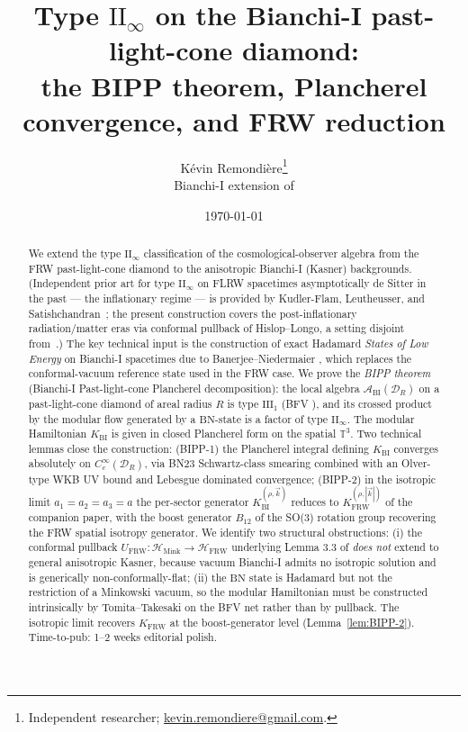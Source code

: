 \documentclass[11pt,a4paper]{article}
\title{Type $\mathrm{II}_\infty$ on the Bianchi-I past-light-cone diamond:\\
the BIPP theorem, Plancherel convergence, and FRW reduction}
\author{K\'evin Remondi\`ere\thanks{Independent researcher; \href{mailto:kevin.remondiere@gmail.com}{kevin.remondiere@gmail.com}.}\\
\small Bianchi-I extension of \cite{ECI-FRW-note}}
\date{\today}
\theoremstyle{definition}
\newcommand{\T}{\mathbb{T}}
\newcommand{\cA}{\mathcal{A}}
\newcommand{\cH}{\mathcal{H}}
\newcommand{\cD}{\mathcal{D}}
\newcommand{\Mink}{\mathrm{Mink}}
\newcommand{\BI}{\mathrm{BI}}
\newcommand{\FRW}{\mathrm{FRW}}
\newcommand{\BN}{\mathrm{BN}}
\begin{document}
\maketitle

\begin{abstract}
We extend the type $\mathrm{II}_\infty$ classification of the cosmological-observer
algebra from the FRW past-light-cone diamond \cite{ECI-FRW-note,Witten2022,KLS24} to
the anisotropic Bianchi-I (Kasner) backgrounds. (Independent prior art for type
$\mathrm{II}_\infty$ on FLRW spacetimes asymptotically de Sitter in the past --- the
inflationary regime --- is provided by Kudler-Flam, Leutheusser, and
Satishchandran~\cite{KLS24}; the present construction covers the
post-inflationary radiation/matter eras via conformal pullback of
Hislop--Longo, a setting disjoint from~\cite{KLS24}.) The key technical input
is the construction of exact Hadamard \emph{States of Low Energy} on Bianchi-I
spacetimes due to Banerjee--Niedermaier \cite{BN23}, which replaces the
conformal-vacuum reference state used in the FRW case. We prove the
\emph{BIPP theorem} (Bianchi-I Past-light-cone Plancherel decomposition):
the local algebra $\cA_\BI(\cD_R)$ on a past-light-cone diamond of areal
radius $R$ is type $\mathrm{III}_1$ (BFV \cite{BFV03}), and its crossed product
by the modular flow generated by a $\BN$-state is a factor of type
$\mathrm{II}_\infty$. The modular Hamiltonian $K_\BI$ is given in closed
Plancherel form on the spatial $\T^3$. Two technical lemmas close the
construction: (BIPP-1) the Plancherel integral defining $K_\BI$ converges
absolutely on $C_c^\infty(\cD_R)$, via BN23 Schwartz-class smearing
combined with an Olver-type WKB UV bound and Lebesgue dominated
convergence; (BIPP-2) in the isotropic limit $a_1=a_2=a_3=a$ the
per-sector generator $K_\BI^{(\rho,\vec k)}$ reduces to $K_\FRW^{(\rho,|\vec k|)}$
of the companion paper, with the boost generator $B_{12}$ of the
SO(3) rotation group recovering the FRW spatial isotropy generator. We
identify two structural obstructions: (i) the conformal pullback
$U_\FRW : \cH_\Mink \to \cH_\FRW$ underlying Lemma 3.3
of \cite{ECI-FRW-note} \emph{does not} extend to general anisotropic Kasner,
because vacuum Bianchi-I admits no isotropic solution and is generically
non-conformally-flat; (ii) the $\BN$ state is Hadamard but not the
restriction of a Minkowski vacuum, so the modular Hamiltonian must be
constructed intrinsically by Tomita--Takesaki on the BFV net rather than
by pullback. The isotropic limit recovers $K_\FRW$ at the boost-generator
level (Lemma~\ref{lem:BIPP-2}). Time-to-pub: 1--2 weeks editorial polish.
\end{abstract}
\end{document}
